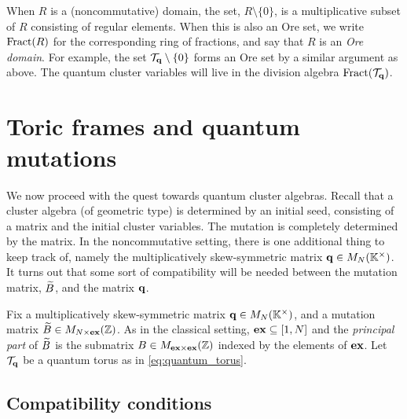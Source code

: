 When $R$ is a (noncommutative) domain, the set, $R \setminus \{0\}$, is a
multiplicative subset of $R$ consisting of regular elements. When this is also an Ore
set, we write $\operatorname{Fract}(R)$ for the corresponding ring of
fractions, and say that $R$ is an \emph{Ore domain}. For example, the
set $\mathcal{T}_{\mathbf{q}} \setminus \{0\}$ forms an Ore set by a similar argument as above. The
quantum cluster variables will live in the division algebra $\operatorname{Fract}(\mathcal{T}_{\mathbf{q}})$.

\section{Toric frames and quantum mutations}

We now proceed with the quest towards quantum cluster algebras. Recall that a cluster
algebra (of geometric type) is determined by an initial seed, consisting of a matrix
and the initial cluster variables. The mutation is completely determined by the matrix.
In the noncommutative setting, there is one additional thing to keep track of, namely
the multiplicatively skew-symmetric matrix $\mathbf{q} \in M_N(\mathbb{K}^\times)$. It turns out
that some sort of compatibility will be needed between the mutation matrix, $\widetilde{B}$, and
the matrix $\mathbf{q}$.

Fix a multiplicatively skew-symmetric matrix $\mathbf{q} \in M_N (\mathbb{K}^\times)$, and a
mutation matrix $\widetilde{B} \in M_{N \times \mathbf{ex}}(\mathbb{Z})$. As in the classical setting, $\mathbf{ex}
	\subseteq [1, N]$ and the \emph{principal part} of $\widetilde{B}$ is the
submatrix $B \in M_{\mathbf{ex} \times \mathbf{ex}}(\mathbb{Z})$ indexed by the elements of $\mathbf{ex}$. Let
$\mathcal{T}_{\mathbf{q}}$ be a quantum torus as in \cref{eq:quantum_torus}.

\subsection{Compatibility conditions}

